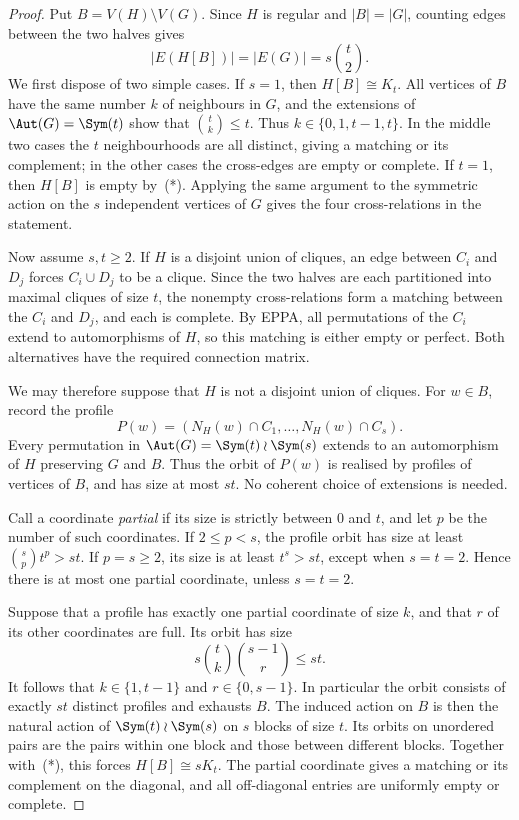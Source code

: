 \begin{proof}
Put $B=V(H)\setminus V(G)$. Since $H$ is regular and
$|B|=|G|$, counting edges between the two halves gives
\[
 |E(H[B])|=|E(G)|=s\binom t2.                    \tag{*}
\]
We first dispose of two simple cases. If $s=1$, then
$H[B]\cong K_t$. All vertices of $B$ have the same number
$k$ of neighbours in $G$, and the extensions of
$\Aut(G)=\Sym(t)$ show that $\binom tk\le t$.
Thus $k\in\{0,1,t-1,t\}$. In the middle two cases the
$t$ neighbourhoods are all distinct, giving a matching
or its complement; in the other cases the cross-edges
are empty or complete. If $t=1$, then $H[B]$ is empty
by~(*). Applying the same argument to the symmetric
action on the $s$ independent vertices of $G$ gives
the four cross-relations in the statement.

Now assume $s,t\ge2$. If $H$ is a disjoint union of
cliques, an edge between $C_i$ and $D_j$ forces
$C_i\cup D_j$ to be a clique. Since the two halves
are each partitioned into maximal cliques of size $t$,
the nonempty cross-relations form a matching between
the $C_i$ and $D_j$, and each is complete. By EPPA,
all permutations of the $C_i$ extend to automorphisms
of $H$, so this matching is either empty or perfect.
Both alternatives have the required connection matrix.

We may therefore suppose that $H$ is not a disjoint
union of cliques. For $w\in B$, record the profile
\[
 P(w)=(N_H(w)\cap C_1,\ldots,N_H(w)\cap C_s).
\]
Every permutation in
$\Aut(G)=\Sym(t)\wr\Sym(s)$ extends to an automorphism
of $H$ preserving $G$ and $B$. Thus the orbit of
$P(w)$ is realised by profiles of vertices of $B$,
and has size at most $st$. No coherent choice of
extensions is needed.

Call a coordinate \emph{partial} if its size is strictly
between $0$ and $t$, and let $p$ be the number of such
coordinates. If $2\le p<s$, the profile orbit has size at least
$\binom sp t^p>st$. If $p=s\ge2$, its size is at least
$t^s>st$, except when $s=t=2$. Hence there is at most
one partial coordinate, unless $s=t=2$.

Suppose that a profile has exactly one partial
coordinate of size $k$, and that $r$ of its other
coordinates are full. Its orbit has size
\[
  s\binom tk\binom{s-1}{r}\le st.
\]
It follows that $k\in\{1,t-1\}$ and
$r\in\{0,s-1\}$. In particular the orbit consists of
exactly $st$ distinct profiles and exhausts $B$.
The induced action on $B$ is then the natural action
of $\Sym(t)\wr\Sym(s)$ on $s$ blocks of size $t$.
Its orbits on unordered pairs are the pairs within
one block and those between different blocks.
Together with~(*), this forces $H[B]\cong sK_t$.
The partial coordinate gives a matching or its
complement on the diagonal, and all off-diagonal
entries are uniformly empty or complete.


\end{proof}

